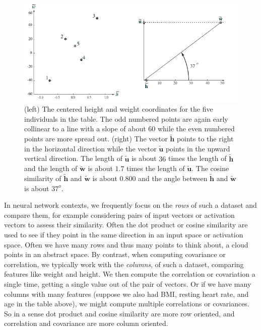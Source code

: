 \begin{figure}[h]
\centering
\includegraphics[scale=1.25]{./images/heightWeight2.pdf}
\caption{(left) The centered height and weight coordinates for the five 
individuals in the table.  The odd numbered points are again early collinear to 
a line with a slope of about $60$ while the even numbered points are more 
spread out.  (right)  The vector $\widetilde{\mathbf{h}}$ points to the right 
in the horizontal direction while the vector $\widetilde{\mathbf{u}}$ points in 
the upward vertical direction.  The length of $\widetilde{\mathbf{u}}$ is about 
$36$ times the length of $\widetilde{\mathbf{h}}$ and the length of 
$\widetilde{\mathbf{w}}$ is about $1.7$ times the length of 
$\widetilde{\mathbf{u}}$.  The cosine similarity of $\widetilde{\mathbf{h}}$ 
and $\widetilde{\mathbf{w}}$ is about 0.800 and the angle between 
$\widetilde{\mathbf{h}}$ and $\widetilde{\mathbf{w}}$ is about $37^o$.} 
\label{twogeoms2}
\end{figure}

In neural network contexts, we frequently focus on the \emph{rows} of such a 
dataset and compare them, for example considering pairs of input vectors or 
activation vectors to assess their similarity.  Often the dot product or cosine 
similarity are used to see if they point in the same direction in an input 
space or activation space.  Often we have many rows and thus many points to 
think about, a cloud points in an abstract space.  By contrast, when computing 
covariance or correlation, we typically work with the \emph{columns}, of such a 
dataset, comparing features like weight and height. We then compute the 
correlation or covariation a single time, getting a single value out of the 
pair of vectors.  Or if we have many columns with many features (suppose we 
also had BMI, resting heart rate, and age in the table above), we might compute 
multiple correlations or covariances.  So in a sense dot product and cosine 
similarity are more row oriented, and correlation and covariance are more 
column oriented.

